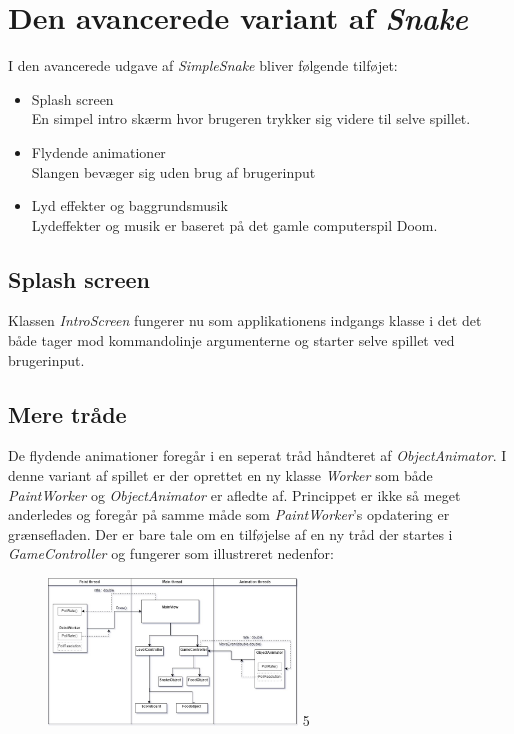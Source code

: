 \documentclass[]{article}
\begin{document}
\section{Den avancerede variant af \textit{Snake}}
I den avancerede udgave af \textit{SimpleSnake} bliver følgende tilføjet:
\begin{itemize}
	\item Splash screen \\
	En simpel intro skærm hvor brugeren trykker sig videre til selve spillet.
	\item Flydende animationer \\
	Slangen bevæger sig uden brug af brugerinput
	\item Lyd effekter og baggrundsmusik \\
	Lydeffekter og musik er baseret på det gamle computerspil Doom.
	
\end{itemize}
	
	\subsection{Splash screen}
	
	Klassen \textit{IntroScreen} fungerer nu som applikationens indgangs klasse i det det både tager mod kommandolinje argumenterne og starter selve spillet ved brugerinput. 
	
	\subsection{Mere tråde}
	
	De flydende animationer foregår i en seperat tråd håndteret af \textit{ObjectAnimator}. I denne variant af spillet er der oprettet en ny klasse \textit{Worker} som både \textit{PaintWorker} og \textit{ObjectAnimator} er afledte af. Princippet er ikke så meget anderledes og foregår på samme måde som \textit{PaintWorker}'s opdatering er grænsefladen. Der er bare tale om en tilføjelse af en ny tråd der startes i \textit{GameController} og fungerer som illustreret nedenfor:
	
	\begin{figure}[h!]
		\centering
		\includegraphics[width=250px]{Thread_diagram_2.jpg}
		\label{fig:thread2}5
	\end{figure}
	
\end{document}
